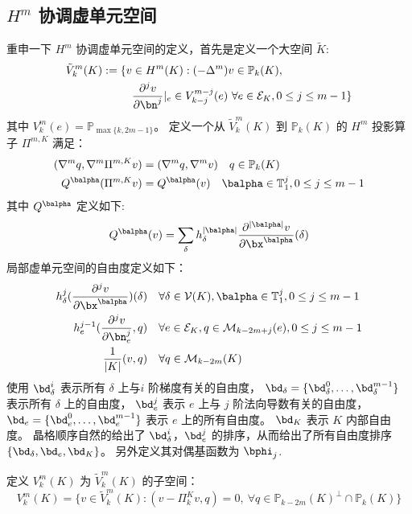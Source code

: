 \subsection{$H^m$ 协调虚单元空间}
重申一下 $H^m$ 协调虚单元空间的定义，首先是定义一个大空间 $\tilde{K}$:
$$
\begin{aligned}
    \tilde{V}_k^m(K) := \{v & \in H^m(K): (-\Delta^m)v \in \mathbb{P}_k(K), \\
        & \frac{\partial^j v}{\partial \bn^j}|_e \in V_{k-j}^{m-j}(e)
    \ \forall e \in \mathcal{E}_K, 0\leq j \leq m-1\}
\end{aligned}
$$
其中 $V_k^{m}(e) = \mathbb{P}_{\max\{k, 2m-1\}}$。
定义一个从 $\tilde{V}_k^m(K)$ 到 $\mathbb{P}_k(K)$ 的 $H^m$ 投影算子 $\Pi^{m,
K}$ 满足：
\begin{equation}
\label{eq:hmproj}
\begin{aligned}
(\nabla^m q, \nabla^m\Pi^{m, K}v) & = (\nabla^m q, \nabla^m v)  \quad q \in
\mathbb{P}_k(K)\\
Q^{\balpha}(\Pi^{m, K}v) & = Q^{\balpha}(v) \quad  \balpha \in
\mathbb{T}_{1}^j, 0\leq j \leq m-1
\end{aligned}
\end{equation}
其中 $Q^{\balpha}$ 定义如下:
$$
Q^{\balpha}(v) = \sum_{\delta} h_{\delta}^{|\balpha|} \frac{\partial^{|\balpha|}
v}{\partial \bx^{\balpha}}(\delta)
$$
局部虚单元空间的自由度定义如下：
$$
\begin{aligned}
h_\delta^j (\frac{\partial^j v}{\partial \bx^{\balpha}})(\delta) &
    \quad \forall \delta \in \mathcal{V}(K), \balpha \in \mathbb{T}_{1}^j, 0\leq
    j \leq m-1\\
    h_e^{j-1}(\frac{\partial^{j} v}{\partial \bn_e^j}, q) & \quad \forall e \in
    \mathcal{E}_K, q \in \mathcal{M}_{k-2m+j}(e), 0\leq j \leq m-1\\
    \frac{1}{|K|}(v, q) & \quad \forall q \in \mathcal{M}_{k-2m}(K)
\end{aligned}
$$
使用 $\bd_{\delta}^i$ 表示所有 $\delta$ 上与$i$ 阶梯度有关的自由度，
$\bd_{\delta} = \{\bd_{\delta}^0, \ldots, \bd_{\delta}^{m-1}\}$ 表示所有
$\delta$ 上的自由度，
$\bd_e^j$ 表示 $e$ 上与 $j$ 阶法向导数有关的自由度，
$\bd_e = \{\bd_e^0, \ldots, \bd_e^{m-1}\}$ 表示 $e$ 上的所有自由度。
$\bd_K$ 表示 $K$ 内部自由度。
晶格顺序自然的给出了 $\bd_{\delta}^i$，$\bd_e^j$
的排序，从而给出了所有自由度排序 $\{\bd_{\delta}, \bd_e, \bd_K\}$。
另外定义其对偶基函数为 $\bphi_j$.

定义 $V_k^m(K)$ 为 $\tilde{V}_k^m(K)$ 的子空间：
$$
V_k^m(K) = \{v \in \tilde{V}_k^m(K): (v-\Pi^{K}_kv, q) = 0,\ \forall q \in
\mathbb{P}_{k-2m}(K)^{\perp}\cap \mathbb{P}_k(K)\}
$$
